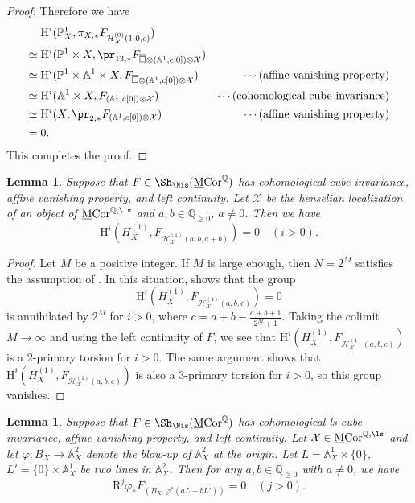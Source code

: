 \documentclass{amsart}
\theoremstyle{plain}
\newtheorem{lemma}[theorem]{Lemma}
\theoremstyle{definition}
\theoremstyle{remark}
\numberwithin{equation}{section}
\def\bcube{{\overline{\square}}}
\def\MCor{\mathrm{\underline{M}Cor}}
\begin{document}
\begin{proof}
    Therefore we have
    \begin{align*}
        &\mathrm{H}^i(\mathbb{P}^1_X, \pi_{X,*}F_{\mathcal{H}_\mathcal{X}^{(0)}(1,0,c)})\\
        \simeq{} &\mathrm{H}^i(\mathbb{P}^1\times X, \pr_{13,*}F_{\bcube \otimes (\mathbb{A}^1,c[0])\otimes\mathcal{X}})\\
        \simeq{} &\mathrm{H}^i(\mathbb{P}^1\times\mathbb{A}^1\times X, F_{\bcube \otimes (\mathbb{A}^1,c[0])\otimes\mathcal{X}})
        &\cdots\text{(affine vanishing property)}\\
        \simeq{} &\mathrm{H}^i(\mathbb{A}^1\times X, F_{(\mathbb{A}^1,c[0])\otimes\mathcal{X}})
        &\cdots\text{(cohomological cube invariance)}\\
        \simeq{} &\mathrm{H}^i(X, \pr_{2,*} F_{(\mathbb{A}^1,c[0])\otimes\mathcal{X}})
        &\cdots\text{(affine vanishing property)}\\
        ={}&0.
    \end{align*}
    This completes the proof.
\end{proof}

\begin{lemma}\label{Hirzebruch_vanishing_2}
	Suppose that $F\in \Sh_\Nis(\MCor^{\mathbb{Q}})$ has cohomological cube invariance, affine vanishing property, and left continuity.
	Let $\mathcal{X}$ be the henselian localization of an object of $\MCor^{\mathbb{Q},\ls}$ and $a,b\in \mathbb{Q}_{\geq 0}$, $a\neq 0$.
	Then we have
        $$
		\mathrm{H}^i(H^{(1)}_X, F_{\mathcal{H}^{(1)}_\mathcal{X}(a,b,a+b)})=0\quad (i>0).
	$$
\end{lemma}

\begin{proof}
    Let $M$ be a positive integer.
    If $M$ is large enough, then $N=2^M$ satisfies the assumption of .
    In this situation,  shows that the group
    $$
        \mathrm{H}^i(H^{(1)}_X, F_{\mathcal{H}^{(1)}_\mathcal{X}(a,b,c)})=0
    $$
    is annihilated by $2^M$ for $i>0$, where $c=a+b-\frac{a+b+1}{2^M+1}$.
    Taking the colimit $M\to \infty$ and using the left continuity of $F$, we see that $\mathrm{H}^i(H^{(1)}_X, F_{\mathcal{H}^{(1)}_\mathcal{X}(a,b,c)})$ is a $2$-primary torsion for $i>0$.
    The same argument shows that $\mathrm{H}^i(H^{(1)}_X, F_{\mathcal{H}^{(1)}_\mathcal{X}(a,b,c)})$ is also a $3$-primary torsion for $i>0$, so this group vanishes.
\end{proof}


\begin{lemma}\label{blowup-a2}
    Suppose that $F\in \Sh_\Nis(\MCor^{\mathbb{Q}})$ has cohomological ls cube invariance, affine vanishing property, and left continuity.
    Let $\mathcal{X}\in \MCor^{\mathbb{Q},\ls}$ and let $\varphi\colon B_X\to \mathbb{A}^2_X$ denote the blow-up of $\mathbb{A}^2_X$ at the origin.
    Let $L=\mathbb{A}^1_X\times\{0\}$, $L'=\{0\}\times\mathbb{A}^1_X$ be two lines in $\mathbb{A}^2_X$.
    Then for any $a,b\in \mathbb{Q}_{\geq 0}$ with $a\neq 0$, we have
    $$
        \mathrm{R}^j\varphi_*F_{(B_X,\varphi^*(aL+bL'))}=0\quad(j>0).
    $$
\end{lemma}
\end{document}
